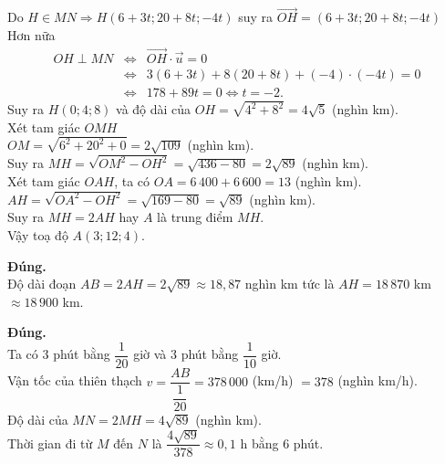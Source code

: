 \begin{ex}[MH-2025]
{\begin{itemchoice}
\begin{center}
\begin{tikzpicture}[line join = round, line cap=round,>=stealth,font=\footnotesize,transform shape,scale=0.7]
                \end{tikzpicture}
            \end{center}
            Do $H\in MN\Rightarrow H(6+3t;20+8t;-4t)$ suy ra $\overrightarrow{OH}=(6+3t;20+8t;-4t)$ 
            \\
            Hơn nữa
            \begin{eqnarray*}
                OH\perp MN &\Leftrightarrow& \overrightarrow{OH}\cdot \overrightarrow{u}=0
                \\
                &\Leftrightarrow& 3(6 + 3t) + 8(20 + 8t) + (-4)\cdot (-4t)=0
                \\
                &\Leftrightarrow&178 + 89t=0 \Leftrightarrow t=-2.
            \end{eqnarray*}
            Suy ra $H(0;4;8)$ và độ dài của $OH=\sqrt{4^2+8^2}=4\sqrt 5$ (nghìn km).
            \\
            Xét tam giác $OMH$
            \\ 
            $OM=\sqrt{6^2+20^2+0}=2\sqrt{109}$ (nghìn km).
            \\
            Suy ra $MH=\sqrt{OM^2-OH^2}=\sqrt{436-80}=2\sqrt{89}$ (nghìn km).
            \\
            Xét tam giác $OAH$, ta có $OA=6\,400+6\,600=13$ (nghìn km).
            \\
            $AH=\sqrt{OA^2-OH^2}=\sqrt{169-80}=\sqrt{89}$ (nghìn km).
            \\
            Suy ra $MH=2AH$ hay $A$ là trung điểm $MH$.
            \\
            Vậy toạ độ $A(3;12;4)$.
            
            
            \itemch \textbf{Đúng.}
            \\
            Độ dài đoạn $AB=2AH=2\sqrt{89}\approx 18{,}87$ nghìn km tức là $AH=18\, 870$ km $\approx 18\, 900$ km.
            
            \itemch \textbf{Đúng.}
            \\
            Ta có $3$ phút bằng $\dfrac{1}{20}$ giờ và $3$ phút bằng $\dfrac{1}{10}$ giờ.
            \\
            Vận tốc của thiên thạch $v=\dfrac{AB}{\dfrac{1}{20}}=378\,000$ (km/h) $=378$ (nghìn km/h).
            \\
            Độ dài của $MN=2MH=4\sqrt{89}$ (nghìn km).
            \\
            Thời gian đi từ $M$ đến $N$ là $\dfrac{4\sqrt{89}}{378}\approx 0{,}1$ h bằng $6$ phút.
        \end{itemchoice}
    }
\end{ex}


